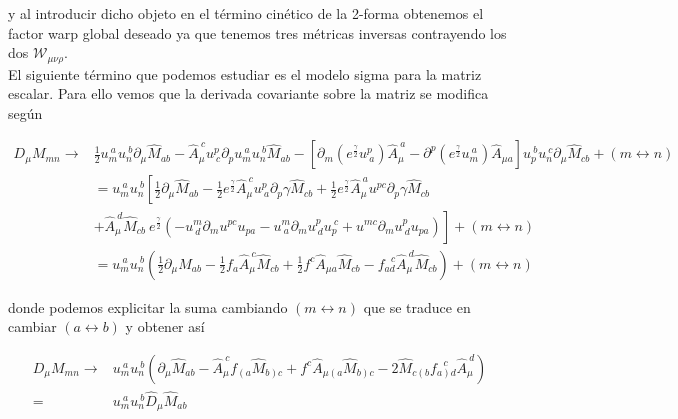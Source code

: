 \documentclass{article}
\numberwithin{equation}{section}
\begin{document}
y al introducir dicho objeto en el término cinético de la 2-forma obtenemos el factor warp global deseado ya que tenemos tres métricas inversas contrayendo los dos $ \mathcal{W}_{\mu \nu \rho} $.\\


El siguiente término que podemos estudiar es el modelo sigma para la matriz escalar. Para ello vemos que la derivada covariante sobre la matriz se modifica según

\begin{equation}
\begin{aligned}
D_{\mu} M_{m n} \longrightarrow& \frac{1}{2} u_{m}^{ \ a} u_{n}^{ \ b} \partial_{\mu} \hat{M}_{a b} - \hat{A}_{\mu}^{\ c} u^{p}_{ \ c} \partial_p u_{m}^{ \ a} u_{n}^{ \ b} \hat{M}_{a b} - \left[ \partial_m \left( e^{\frac{\gamma}{2}} u^{p}_{ \ a} \right) \hat{A}_{\mu}^{\ a} - \partial^p  \left( e^{\frac{\gamma}{2}} u_{m}^{ \ a} \right) \hat{A}_{\mu a} \right] u_{p}^{ \ b} u_{n}^{ \ c} \partial_{\mu} \hat{M}_{c b} + \left(m \leftrightarrow n\right)\\
&= u_{m}^{ \ a} u_{n}^{ \ b} \left[ \frac{1}{2}\partial_{\mu} \hat{M}_{a b} - \frac{1}{2} e^{\frac{\gamma}{2}}  \hat{A}_{\mu}^{\ c} u^{p}_{ \ a} \partial_p \gamma \hat{M}_{c b} + \frac{1}{2} e^{\frac{\gamma}{2}} \hat{A}_{\mu}^{\ a} u^{p c} \partial_p \gamma \hat{M}_{c b} \right.\\
&\left. + \hat{A}_{\mu}^{\ d} \hat{M}_{c b} \ e^{\frac{\gamma}{2}} \left( - u^{m}_{ \ d} \partial_m u^{p c} u_{p a} - u^{m}_{ \ a} \partial_m u^{p}_{ \ d} u_{p}^{\ c} + u^{m c} \partial_m u^{p}_{ \ d} u_{p a}\right) \right] + \left(m \leftrightarrow n\right)\\
&=  u_{m}^{ \ a} u_{n}^{ \ b} \left( \frac{1}{2}\partial_{\mu} \hat{M}_{a b} - \frac{1}{2} f_a \hat{A}_{\mu}^{\ c} \hat{M}_{c b} + \frac{1}{2} f^c \hat{A}_{\mu a} \hat{M}_{c b} - f_{a d}^{\ \ \  c} \hat{A}_{\mu}^{\ d} \hat{M}_{c b} \right) + \left(m \leftrightarrow n\right)
\end{aligned}
\end{equation}

donde podemos explicitar la suma cambiando $ \left(m \leftrightarrow n\right) $ que se traduce en cambiar $ \left(a \leftrightarrow b\right) $ y obtener así

\begin{equation}
\begin{aligned}
D_{\mu} M_{m n} \longrightarrow& u_{m}^{ \ a} u_{n}^{ \ b} \left( \partial_{\mu} \hat{M}_{a b} - \hat{A}_{\mu}^{\ c} f_{\left( a \right.}\hat{M}_{\left. b\right) c} + f^c \hat{A}_{\mu \left( a\right.} \hat{M}_{\left. b\right) c} - 2 \hat{M}_{c \left( b\right.}f_{\left. a\right) d}^{\ \ \  c} \hat{A}_{\mu}^{\ d}  \right)\\
=& u_{m}^{ \ a} u_{n}^{ \ b} \hat{D}_{\mu} \hat{M}_{a b}
\end{aligned}
\end{equation}
\end{document}
